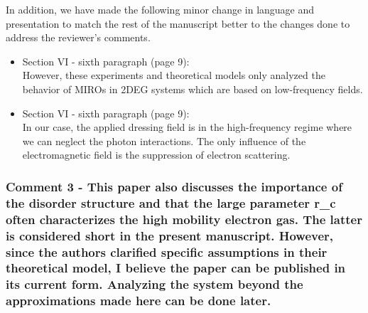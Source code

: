 \documentclass{article}
\begin{document}
In addition, we have made the following minor change in language and presentation to match the rest of the manuscript better to the changes done to address the reviewer’s comments.

\begin{itemize}
  \item Section VI - sixth paragraph (page 9):\\
  {\color{Red}
  However, these experiments and theoretical models only analyzed the behavior of MIROs in 2DEG systems which are based on low-frequency fields.
  }
  \item Section VI - sixth paragraph (page 9):\\
  {\color{Red} In our case, the applied dressing field is in the high-frequency regime where we can neglect the photon interactions. The only influence of the electromagnetic field is the suppression of electron scattering.}
\end{itemize}


\subsubsection*{Comment 3 -
\color{RoyalBlue} This paper also discusses the importance of the disorder structure and that the large parameter r\_c often characterizes the high mobility electron gas. The latter is considered short in the present manuscript. However, since the authors clarified specific assumptions in their theoretical model, I believe the paper can be published in its current form. Analyzing the system beyond the approximations made here can be done later.}
\end{document}
